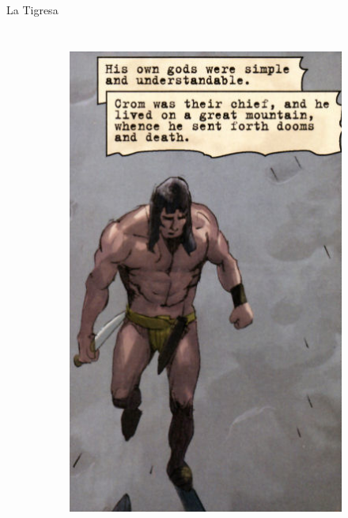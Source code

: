 \begin{frame}{La Tigresa}
\begin{columns}
\begin{figure}[htp]
\begin{subfigure}[b]{0.27\textwidth}
				\includegraphics[width=\textwidth]{img/conan/DH}
			\end{subfigure}
			~
			\begin{subfigure}[b]{0.23\textwidth}

\end{subfigure}
\end{figure}
\end{columns}
\end{frame}

